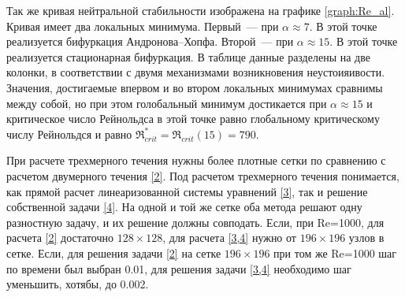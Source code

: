 Так же кривая нейтральной стабильности изображена на графике \ref{graph:Re_al}. Кривая имеет два локальных минимума. Первый~--- при $\alpha \approx 7 $. В этой точке реализуется бифуркация Андронова--Хопфа. Второй~--- при $\alpha \approx 15$. В этой точке реализуется стационарная бифуркация. В таблице данные разделены на две колонки, в соответствии с двумя механизмами возникновения неустоияивости.  Значения, достигаемые впервом и во втором локальных минимумах сравнимы между собой, но при этом голобальный минимум достикается при $\alpha \approx 15$ и критическое число Рейнольдса в этой точке равно глобальному критическому числу Рейнольдся и равно $\Re_{crit}^* = \Re_{crit}(15) = 790$. 

При расчете трехмерного течения нужны более плотные сетки по сравнению с расчетом двумерного течения \ref{2}. Под расчетом трехмерного течения понимается, как прямой расчет линеаризованной системы уравнений \ref{3}, так и решение собственной задачи \ref{4}. На одной и той же сетке оба метода решают одну разностную задачу, и их решение должны совподать. Если, при Re=1000, для расчета \ref{2} достаточно $128 \times 128$, для расчета \ref{3,4} нужно от $196 \times 196$ узлов в сетке. Если, для решения задачи \ref{2} на сетке $196 \times 196$ при том же Re=1000 шаг по времени был выбран 0.01, для решения задачи \ref{3,4} необходимо шаг уменьшить, хотябы, до 0.002.  

